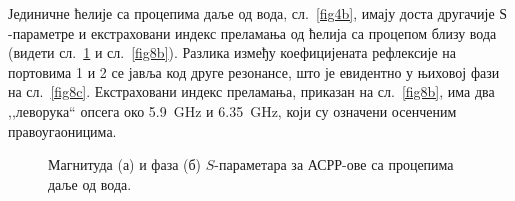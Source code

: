 Јединичне ћелије са процепима даље од вода, сл.~\ref{fig4b}, имају доста другачије $Ѕ$-параметре и екстраховани индекс преламања од ћелија са процепом близу вода (видети сл.~\ref{fig8} и сл.~\ref{fig8b}). Разлика између коефицијената рефлексије на портовима 1 и 2 се јавља код друге резонансе, што је евидентно у њиховој фази на сл.~\ref{fig8c}. Екстраховани индекс преламања, приказан на сл.~\ref{fig8b}, има два ,,леворука`` опсега око \SI{5.9}{\giga\hertz} и \SI{6.35}{\giga\hertz}, који су означени осенченим правоугаоницима.
\begin{figure}[!t]
\hfill
{}
\caption{Магнитуда (а) и фаза (б) $S$-параметара за АСРР-ове са процепима даље од вода.}
\label{fig8}
\end{figure}
